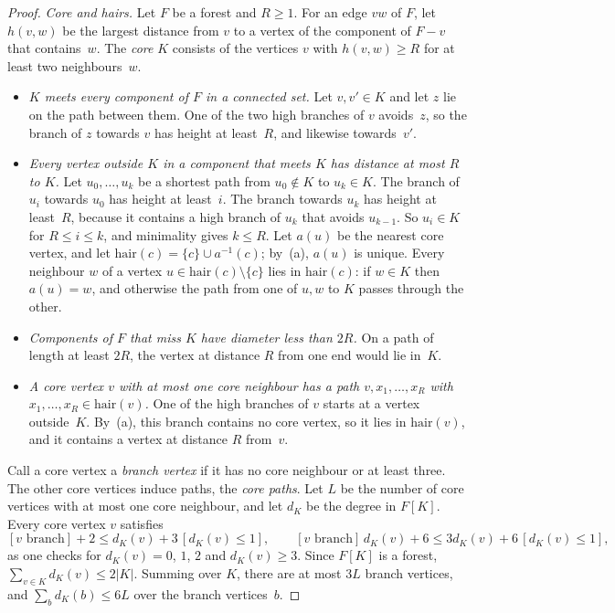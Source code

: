 \documentclass[11pt]{article}
\theoremstyle{remark}
\begin{document}
\begin{proof}
\emph{Core and hairs.} Let $F$ be a forest and $R\ge1$. For an edge $vw$ of $F$, let $h(v,w)$ be the
largest distance from $v$ to a vertex of the component of $F-v$ that contains~$w$. The \emph{core}
$K$ consists of the vertices $v$ with $h(v,w)\ge R$ for at least two neighbours~$w$.
\begin{itemize}
\item[(a)] \emph{$K$ meets every component of $F$ in a connected set.} Let $v,v'\in K$ and let $z$ lie
  on the path between them. One of the two high branches of $v$ avoids~$z$, so the branch of $z$
  towards $v$ has height at least~$R$, and likewise towards~$v'$.
\item[(b)] \emph{Every vertex outside $K$ in a component that meets $K$ has distance at most $R$ to
  $K$.} Let $u_0,\dots,u_k$ be a shortest path from $u_0\notin K$ to $u_k\in K$. The branch of $u_i$
  towards $u_0$ has height at least~$i$. The branch towards $u_k$ has height at least~$R$, because it
  contains a high branch of $u_k$ that avoids $u_{k-1}$. So $u_i\in K$ for $R\le i\le k$, and minimality
  gives $k\le R$. Let $a(u)$ be the nearest core vertex, and let
  $\mathrm{hair}(c)=\{c\}\cup a^{-1}(c)$; by~(a), $a(u)$ is unique. Every neighbour $w$ of a vertex
  $u\in\mathrm{hair}(c)\setminus\{c\}$ lies in $\mathrm{hair}(c)$: if $w\in K$ then $a(u)=w$, and
  otherwise the path from one of $u,w$ to $K$ passes through the other.
\item[(c)] \emph{Components of $F$ that miss $K$ have diameter less than $2R$.} On a path of length at
  least $2R$, the vertex at distance $R$ from one end would lie in~$K$.
\item[(d)] \emph{A core vertex $v$ with at most one core neighbour has a path $v,x_1,\dots,x_R$ with
  $x_1,\dots,x_R\in\mathrm{hair}(v)$.} One of the high branches of $v$ starts at a vertex outside~$K$.
  By~(a), this branch contains no core vertex, so it lies in $\mathrm{hair}(v)$, and it contains a
  vertex at distance $R$ from~$v$.
\end{itemize}
Call a core vertex a \emph{branch vertex} if it has no core neighbour or at least three. The other
core vertices induce paths, the \emph{core paths}. Let $L$ be the number of core vertices with at most
one core neighbour, and let $d_K$ be the degree in $F[K]$. Every core vertex $v$ satisfies
\[
  [v\text{ branch}]+2\le d_K(v)+3\,[d_K(v)\le1],\qquad
  [v\text{ branch}]\,d_K(v)+6\le3d_K(v)+6\,[d_K(v)\le1],
\]
as one checks for $d_K(v)=0$, $1$, $2$ and $d_K(v)\ge3$. Since $F[K]$ is a forest,
$\sum_{v\in K}d_K(v)\le2|K|$. Summing over $K$, there are at most $3L$ branch vertices, and
$\sum_bd_K(b)\le6L$ over the branch vertices~$b$.


\end{proof}
\end{document}
